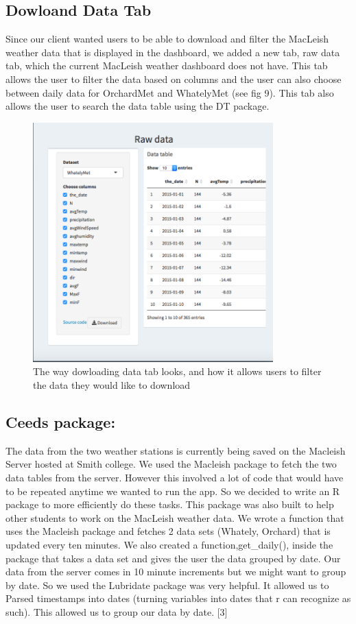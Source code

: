 \documentclass[10pt,letterpaper]{article}
\begin{document}
\subsection{Dowloand Data Tab}\label{dowloand-data-tab}

Since our client wanted users to be able to download and filter the
MacLeish weather data that is displayed in the dashboard, we added a new
tab, raw data tab, which the current MacLeish weather dashboard does not
have. This tab allows the user to filter the data based on columns and
the user can also choose between daily data for OrchardMet and
WhatelyMet (see fig 9). This tab also allows the user to search the data
table using the DT package.

\begin{figure}
\includegraphics[width=350px]{rawdatatab} \caption{The way dowloading data tab looks, and how it allows users to filter the data they would like to download}\label{fig:unnamed-chunk-9}
\end{figure}

\subsection{Ceeds package:}\label{ceeds-package}

The data from the two weather stations is currently being saved on the
Macleish Server hosted at Smith college. We used the Macleish package to
fetch the two data tables from the server. However this involved a lot
of code that would have to be repeated anytime we wanted to run the app.
So we decided to write an R package to more efficiently do these tasks.
This package was also built to help other students to work on the
MacLeish weather data. We wrote a function that uses the Macleish
package and fetches 2 data sets (Whately, Orchard) that is updated every
ten minutes. We also created a function,get\_daily(), inside the package
that takes a data set and gives the user the data grouped by date. Our
data from the server comes in 10 minute increments but we might want to
group by date. So we used the Lubridate package was very helpful. It
allowed us to Parsed timestamps into dates (turning variables into dates
that r can recognize as such). This allowed us to group our data by
date. {[}3{]}
\end{document}
